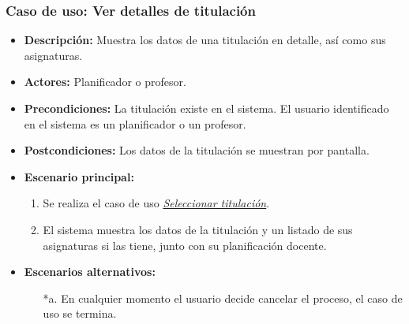 \subsubsection*{Caso de uso: Ver detalles de titulación}
\begin{itemize}
\item{\bf Descripción:} Muestra los datos de una titulación en detalle, así como sus asignaturas.
\item{\bf Actores:} Planificador o profesor.
\item{\bf Precondiciones:} La titulación existe en el sistema. El usuario identificado en el sistema es un planificador o un profesor.
\item{\bf Postcondiciones:} Los datos de la titulación se muestran por pantalla.
\item{\bf Escenario principal:}
	\begin{enumerate}
	\item Se realiza el caso de uso {\em\hyperref[select_titulacion]{Seleccionar titulación}}.
	\item El sistema muestra los datos de la titulación y un listado de sus asignaturas si las tiene, junto con su planificación docente.
	\end{enumerate}
\item{\bf Escenarios alternativos:}
	\begin{itemize}
	\item[*a.] En cualquier momento el usuario decide cancelar el proceso, el caso de uso se termina.
	\end{itemize}
\end{itemize}





